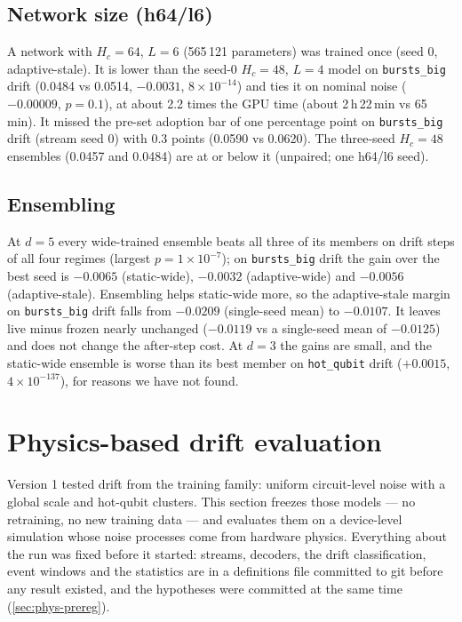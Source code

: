 \documentclass[11pt,a4paper]{article}
\newcommand{\reg}[1]{\texttt{#1}}
\newcommand{\E}[2]{${#1}{\times}10^{-#2}$}  %
\newcommand{\Eb}[2]{{#1}{\times}10^{-#2}}   %
\begin{document}
\subsection{Network size (h64/l6)}
A network with $H_c=64$, $L=6$ (565\,121 parameters) was trained once (seed 0, adaptive-stale). It is lower than the
seed-0 $H_c=48$, $L=4$ model on \reg{bursts\_big} drift (0.0484 vs 0.0514, $-0.0031$, \E{8}{14}) and ties it on nominal
noise ($-0.00009$, $p=0.1$), at about 2.2 times the GPU time (about 2\,h\,22\,min vs 65\,min). It missed the pre-set adoption bar of one
percentage point on \reg{bursts\_big} drift (stream seed 0) with 0.3 points (0.0590 vs 0.0620). The three-seed $H_c=48$
ensembles (0.0457 and 0.0484) are at or below it (unpaired; one h64/l6 seed).

\subsection{Ensembling}\label{sec:abl-ens}
At $d=5$ every wide-trained ensemble beats all three of its members on drift steps of all four regimes (largest
$p=\Eb{1}{7}$); on \reg{bursts\_big} drift the gain over the best seed is $-0.0065$ (static-wide), $-0.0032$
(adaptive-wide) and $-0.0056$ (adaptive-stale). Ensembling helps static-wide more, so the adaptive-stale margin on
\reg{bursts\_big} drift falls from $-0.0209$ (single-seed mean) to $-0.0107$. It leaves live minus frozen nearly unchanged
($-0.0119$ vs a single-seed mean of $-0.0125$) and does not change the after-step cost. At $d=3$ the gains are small, and
the static-wide ensemble is worse than its best member on \reg{hot\_qubit} drift ($+0.0015$, \E{4}{137}), for reasons we
have not found.

\section{Physics-based drift evaluation}\label{sec:physics}

Version 1 tested drift from the training family: uniform circuit-level noise with a global scale and
hot-qubit clusters. This section freezes those models --- no retraining, no new training data --- and
evaluates them on a device-level simulation whose noise processes come from hardware physics. Everything
about the run was fixed before it started: streams, decoders, the drift classification, event windows and
the statistics are in a definitions file committed to git before any result existed, and the hypotheses
were committed at the same time (\cref{sec:phys-prereg}).
\end{document}
